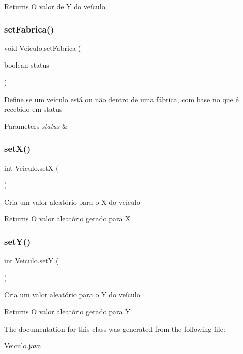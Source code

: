 \begin{DoxyReturn}{Returns}
O valor de Y do veículo 
\end{DoxyReturn}
\mbox{\label{classVeiculo_a8201bb998eb49364bb5d5bb05ce531ab}} 
\subsubsection{\texorpdfstring{set\+Fabrica()}{setFabrica()}}
{\footnotesize\ttfamily void Veiculo.\+set\+Fabrica (\begin{DoxyParamCaption}\item[{boolean}]{status }\end{DoxyParamCaption})\hspace{0.3cm}{\ttfamily [inline]}}

Define se um veículo está ou não dentro de uma fábrica, com base no que é recebido em status


\begin{DoxyParams}{Parameters}
{\em status} & \\
\hline
\end{DoxyParams}
\mbox{\label{classVeiculo_a28cf763354cb7f3d14272c9e793db57e}} 
\subsubsection{\texorpdfstring{set\+X()}{setX()}}
{\footnotesize\ttfamily int Veiculo.\+setX (\begin{DoxyParamCaption}{ }\end{DoxyParamCaption})\hspace{0.3cm}{\ttfamily [inline]}}

Cria um valor aleatório para o X do veículo

\begin{DoxyReturn}{Returns}
O valor aleatório gerado para X 
\end{DoxyReturn}
\mbox{\label{classVeiculo_ac0356427caf9839b90e558c99c09395f}} 
\subsubsection{\texorpdfstring{set\+Y()}{setY()}}
{\footnotesize\ttfamily int Veiculo.\+setY (\begin{DoxyParamCaption}{ }\end{DoxyParamCaption})\hspace{0.3cm}{\ttfamily [inline]}}

Cria um valor aleatório para o Y do veículo

\begin{DoxyReturn}{Returns}
O valor aleatório gerado para Y 
\end{DoxyReturn}


The documentation for this class was generated from the following file\+:\begin{DoxyCompactItemize}
\item 
Veiculo.\+java\end{DoxyCompactItemize}
